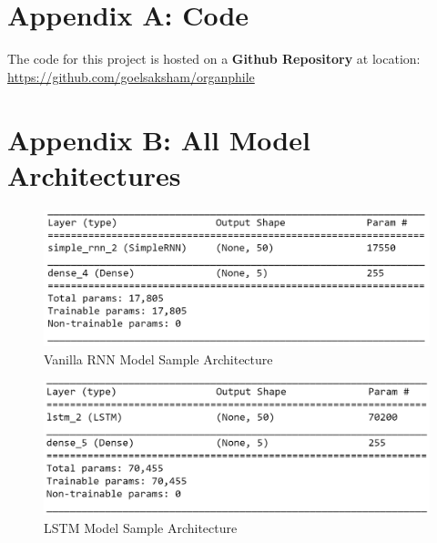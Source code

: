 \documentclass[letterpaper, 12 pt, conference]{ieeeconf}  %
\begin{document}
\section{\textbf{Appendix A: Code}}
The code for this project is hosted on a \textbf{Github Repository} at location: \href{https://github.com/goelsaksham/organphile}{https://github.com/goelsaksham/organphile}



\section{\textbf{Appendix B: All Model Architectures}}

\begin{figure}[!h]
\centering
\includegraphics[scale=0.60]{../figs/model_arch/rnn.png}	
\caption{Vanilla RNN Model Sample Architecture}
\label{fig:Vanilla_RNN_Arch_Model} 
\end{figure}

\begin{figure}[!h]
\centering
\includegraphics[scale=0.60]{../figs/model_arch/lstm.png}	
\caption{LSTM Model Sample Architecture}
\label{fig:LSTM_Arch_Model} 
\end{figure}
\end{document}
